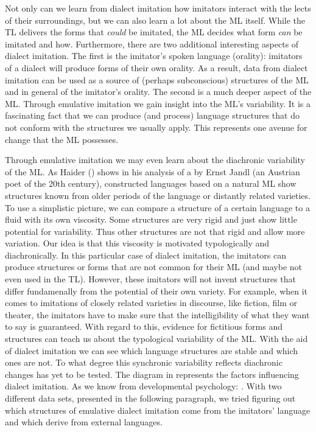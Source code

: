 \documentclass[output=paper]{LSP/langsci}
\begin{document}
Not only can we learn from dialect imitation how imitators interact with the lects of their surroundings, but we can also learn a lot about the ML itself. While the TL delivers the forms that \textit{could} be imitated, the ML decides what form \textit{can} be imitated and how.  Furthermore, there are two additional interesting aspects of dialect imitation. The first is the imitator’s spoken language (orality): imitators of a dialect will produce forms of their own orality. As a result, data from dialect imitation can be used as a source of (perhaps subconscious) structures of the ML and in general of the imitator’s orality. The second is a much deeper aspect of the ML. Through emulative imitation we gain insight into the ML’s variability. It is a fascinating fact that we can produce (and process) language structures that do not conform with the structures we usually  apply. This  represents one avenue for change that the ML possesses. 

Through emulative imitation we may even learn about the diachronic variability of the ML. As Haider (\citeyear[135]{haider_poetenpidgin_2007}) shows in his analysis of a  by Ernst Jandl (an Austrian poet of the 20th century), constructed languages based on a natural ML show structures known from older periods of the language or distantly related varieties. To use a simplistic picture, we can compare a structure of a certain language to a fluid with its own viscosity. Some structures are very rigid and just show little potential for variability. Thus other structures are not that rigid and allow more variation. Our idea is that this viscosity is motivated typologically and diachronically. In this particular case of dialect imitation, the imitators can produce structures or forms that are not common for their ML (and maybe not even used in the TL). However, these imitators will not invent structures that differ fundamenally from the potential of their own variety. For example, when it comes to imitations of closely related varieties in discourse, like fiction, film or theater, the imitators have to make sure that the intelligibility of what they want to say is guaranteed.
With regard to this, evidence for fictitious forms and structures can teach us about the typological variability of the ML. With the aid of dialect imitation we can see which language structures are stable and which ones are not. To what degree this synchronic variability reflects diachronic changes has yet to be tested. The diagram in   represents the factors influencing dialect imitation. As we know from developmental psychology:  \citep[2]{uzgiris_two_1981}. With two different data sets, presented in the following paragraph, we tried figuring out which structures of emulative dialect imitation come from the imitators' language and which derive from external languages.
\end{document}
